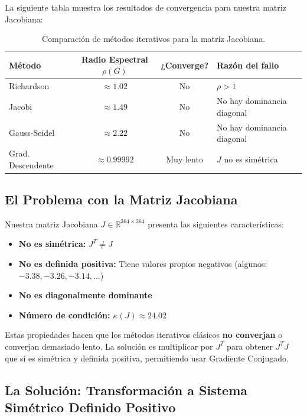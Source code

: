 \documentclass[11pt,letterpaper]{article}
\begin{document}
La siguiente tabla muestra los resultados de convergencia para nuestra matriz Jacobiana:

\begin{table}[H]
\centering
\begin{tabular}{|l|c|c|l|}
\hline
\textbf{Método} & \textbf{Radio Espectral $\rho(G)$} & \textbf{¿Converge?} & \textbf{Razón del fallo} \\
\hline
Richardson & $\approx 1.02$ & No & $\rho > 1$ \\
Jacobi & $\approx 1.49$ & No & No hay dominancia diagonal \\
Gauss-Seidel & $\approx 2.22$ & No & No hay dominancia diagonal \\
Grad. Descendente & $\approx 0.99992$ & Muy lento & $J$ no es simétrica \\
\hline
\end{tabular}
\caption{Comparación de métodos iterativos para la matriz Jacobiana.}
\label{tab:metodos}
\end{table}

\subsection{El Problema con la Matriz Jacobiana}

Nuestra matriz Jacobiana $J \in \mathbb{R}^{364 \times 364}$ presenta las siguientes características:

\begin{itemize}
    \item \textbf{No es simétrica:} $J^T \neq J$
    \item \textbf{No es definida positiva:} Tiene valores propios negativos (algunos: $-3.38, -3.26, -3.14, \ldots$)
    \item \textbf{No es diagonalmente dominante}
    \item \textbf{Número de condición:} $\kappa(J) \approx 24.02$
\end{itemize}

Estas propiedades hacen que los métodos iterativos clásicos \textbf{no converjan} o converjan demasiado lento. La solución es multiplicar por $J^T$ para obtener $J^T J$ que sí es simétrica y definida positiva, permitiendo usar Gradiente Conjugado.

\subsection{La Solución: Transformación a Sistema Simétrico Definido Positivo}
\end{document}

